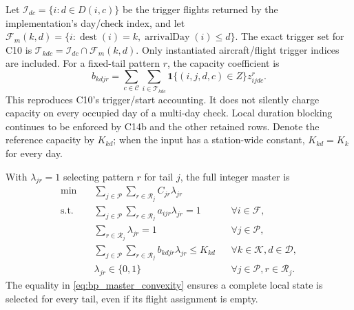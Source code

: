 Let $\mathcal I_{dc}=\{i:d\in D(i,c)\}$ be the trigger flights returned by
the implementation's day/check index, and let
$\mathcal F_m(k,d)=\{i:\operatorname{dest}(i)=k,
\operatorname{arrivalDay}(i)\le d\}$. The exact trigger set for C10 is
$\mathcal T_{kdc}=\mathcal I_{dc}\cap\mathcal F_m(k,d)$. Only instantiated
aircraft/flight trigger indices are included. For a fixed-tail pattern $r$,
the capacity coefficient is
\begin{equation}
 b_{kdjr}=\sum_{c\in\mathcal C}\sum_{i\in\mathcal T_{kdc}}
                    \mathbf 1\{(i,j,d,c)\in Z\}z_{ijdc}^r.
 \label{eq:bp_capacity_coefficient}
\end{equation}
This reproduces C10's trigger/start accounting. It does not silently charge
capacity on every occupied day of a multi-day check. Local duration blocking
continues to be enforced by C14b and the other retained rows. Denote the
reference capacity by $K_{kd}$; when the input has a station-wide constant,
$K_{kd}=K_k$ for every day.

With $\lambda_{jr}=1$ selecting pattern $r$ for tail $j$, the full integer
master is
\begin{align}
 \min\quad &\sum_{j\in\mathcal P}\sum_{r\in\mathcal R_j}C_{jr}\lambda_{jr}
                  \label{eq:bp_master_obj}\\
 \text{s.t.}\quad
 &\sum_{j\in\mathcal P}\sum_{r\in\mathcal R_j}a_{ijr}\lambda_{jr}=1
                  &&\forall i\in\mathcal F,\label{eq:bp_master_cover}\\
 &\sum_{r\in\mathcal R_j}\lambda_{jr}=1
                  &&\forall j\in\mathcal P,\label{eq:bp_master_convexity}\\
 &\sum_{j\in\mathcal P}\sum_{r\in\mathcal R_j}b_{kdjr}\lambda_{jr}\le K_{kd}
                  &&\forall k\in\mathcal K,d\in\mathcal D,
                     \label{eq:bp_master_capacity}\\
 &\lambda_{jr}\in\{0,1\}
                  &&\forall j\in\mathcal P,r\in\mathcal R_j.
                     \label{eq:bp_master_binary}
\end{align}
The equality in \eqref{eq:bp_master_convexity} ensures a complete local state
is selected for every tail, even if its flight assignment is empty.

